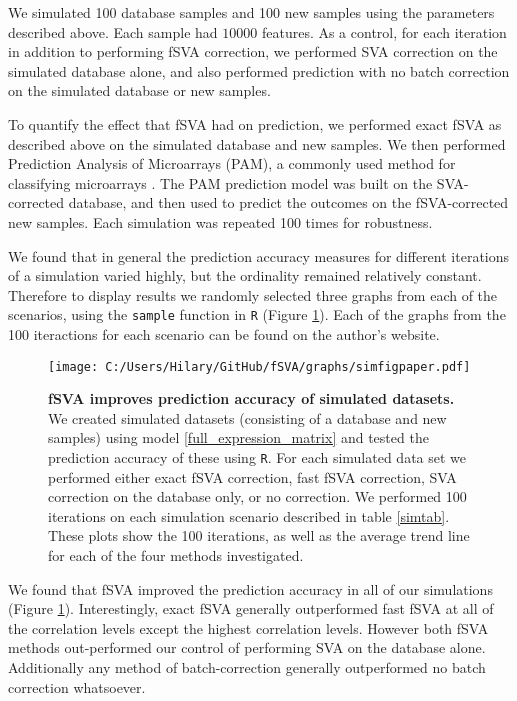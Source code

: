 \documentclass{bioinfo}
\begin{document}
We simulated 100 database samples and 100 new samples using the parameters described above. Each sample had $10000$ features. As a control, for each iteration in addition to performing fSVA correction, we performed SVA correction on the simulated database alone, and also performed prediction with no batch correction on the simulated database or new samples.

To quantify the effect that fSVA had on prediction, we performed exact fSVA as described above on the simulated database and new samples.  We then performed Prediction Analysis of Microarrays (PAM), a commonly used method for classifying microarrays \cite{Tibshirani2002}.  The PAM prediction model was built on the SVA-corrected database, and then used to predict the outcomes on the fSVA-corrected new samples.  Each simulation was repeated 100 times for robustness.

We found that in general the prediction accuracy measures for different iterations of a simulation varied highly, but the ordinality remained relatively constant. Therefore to display results we randomly selected three graphs from each of the scenarios, using the \texttt{sample} function in \texttt{R} (Figure \ref{simres}). Each of the graphs from the 100 iteractions for each scenario can be found on the author's website.



\begin{figure}
\centering
\texttt{[image: C:/Users/Hilary/GitHub/fSVA/graphs/simfigpaper.pdf]}
\caption{\textbf{fSVA improves prediction accuracy of simulated datasets.} We created simulated datasets (consisting of a database and new samples) using model \ref{full_expression_matrix} and tested the prediction accuracy of these using \texttt{R}.  For each simulated data set we performed either exact fSVA correction, fast fSVA correction, SVA correction on the database only, or no correction. We performed 100 iterations on each simulation scenario described in table \ref{simtab}.  These plots show the 100 iterations, as well as the average trend line for each of the four methods investigated.
}
\label{simres}
\end{figure}

We found that fSVA improved the prediction accuracy in all of our simulations (Figure \ref{simres}). Interestingly, exact fSVA generally outperformed fast fSVA at all of the correlation levels except the highest correlation levels. However both fSVA methods out-performed our control of performing SVA on the database alone. Additionally any method of batch-correction generally outperformed no batch correction whatsoever.  
\end{document}
